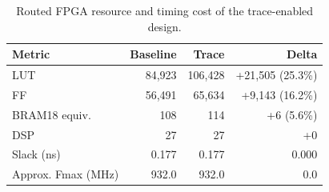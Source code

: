\begin{table}[t]
\centering
\caption{Routed FPGA resource and timing cost of the trace-enabled design.}
\label{tab:resource-timing-cost}
\scriptsize
\begin{tabularx}{\columnwidth}{p{}rrr}
\toprule
Metric & Baseline & Trace & Delta \\
\midrule
LUT & 84,923 & 106,428 & +21,505 (25.3\%) \\
FF & 56,491 & 65,634 & +9,143 (16.2\%) \\
BRAM18 equiv. & 108 & 114 & +6 (5.6\%) \\
DSP & 27 & 27 & +0 \\
Slack (ns) & 0.177 & 0.177 & 0.000 \\
Approx. Fmax (MHz) & 932.0 & 932.0 & 0.0 \\
\bottomrule
\end{tabularx}
\vspace{-0.5em}
\end{table}
